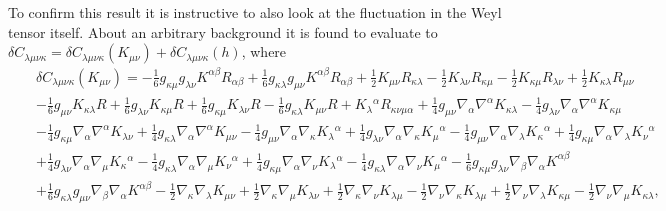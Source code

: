 \documentclass[aps]{revtex4}
\begin{document}
To confirm this result it is instructive to also look at the fluctuation in the Weyl tensor itself. About an arbitrary background it is found to evaluate to $\delta C_{\lambda\mu\nu\kappa}=\delta C_{\lambda\mu\nu\kappa}(K_{\mu\nu})+\delta C_{\lambda\mu\nu\kappa}(h)$, where
%
\begin{eqnarray}
&&\delta C_{\lambda\mu\nu\kappa}(K_{\mu\nu})=- \tfrac{1}{6} g_{\kappa \mu} g_{\lambda \nu} K^{\alpha \beta} R_{\alpha \beta} + \tfrac{1}{6} g_{\kappa \lambda} g_{\mu \nu} K^{\alpha \beta} R_{\alpha \beta} + \tfrac{1}{2} K_{\mu \nu} R_{\kappa \lambda} -  \tfrac{1}{2} K_{\lambda \nu} R_{\kappa \mu} -  \tfrac{1}{2} K_{\kappa \mu} R_{\lambda \nu} 
+ \tfrac{1}{2} K_{\kappa \lambda} R_{\mu \nu} 
\nonumber\\
&&-  \tfrac{1}{6} g_{\mu \nu} K_{\kappa \lambda} R 
+ \tfrac{1}{6} g_{\lambda \nu} K_{\kappa \mu} R + \tfrac{1}{6} g_{\kappa \mu} K_{\lambda \nu} R -  \tfrac{1}{6} g_{\kappa \lambda} K_{\mu \nu} R + K_{\lambda}{}^{\alpha} R_{\kappa \nu \mu \alpha} + \tfrac{1}{4} g_{\mu \nu} \nabla_{\alpha}\nabla^{\alpha}K_{\kappa \lambda} -  \tfrac{1}{4} g_{\lambda \nu} \nabla_{\alpha}\nabla^{\alpha}K_{\kappa \mu} 
\nonumber\\
&&-  \tfrac{1}{4} g_{\kappa \mu} \nabla_{\alpha}\nabla^{\alpha}K_{\lambda \nu} 
+ \tfrac{1}{4} g_{\kappa \lambda} \nabla_{\alpha}\nabla^{\alpha}K_{\mu \nu} -  \tfrac{1}{4} g_{\mu \nu} \nabla_{\alpha}\nabla_{\kappa}K_{\lambda}{}^{\alpha} + \tfrac{1}{4} g_{\lambda \nu} \nabla_{\alpha}\nabla_{\kappa}K_{\mu}{}^{\alpha} -  \tfrac{1}{4} g_{\mu \nu} \nabla_{\alpha}\nabla_{\lambda}K_{\kappa}{}^{\alpha} + \tfrac{1}{4} g_{\kappa \mu} \nabla_{\alpha}\nabla_{\lambda}K_{\nu}{}^{\alpha} 
\nonumber\\
&&+ \tfrac{1}{4} g_{\lambda \nu} \nabla_{\alpha}\nabla_{\mu}K_{\kappa}{}^{\alpha} -  \tfrac{1}{4} g_{\kappa \lambda} \nabla_{\alpha}\nabla_{\mu}K_{\nu}{}^{\alpha} + \tfrac{1}{4} g_{\kappa \mu} \nabla_{\alpha}\nabla_{\nu}K_{\lambda}{}^{\alpha} -  \tfrac{1}{4} g_{\kappa \lambda} \nabla_{\alpha}\nabla_{\nu}K_{\mu}{}^{\alpha} 
-  \tfrac{1}{6} g_{\kappa \mu} g_{\lambda \nu} \nabla_{\beta}\nabla_{\alpha}K^{\alpha \beta} 
\nonumber\\
&&+ \tfrac{1}{6} g_{\kappa \lambda} g_{\mu \nu} \nabla_{\beta}\nabla_{\alpha}K^{\alpha \beta} 
-  \tfrac{1}{2} \nabla_{\kappa}\nabla_{\lambda}K_{\mu \nu} + \tfrac{1}{2} \nabla_{\kappa}\nabla_{\mu}K_{\lambda \nu} 
+ \tfrac{1}{2} \nabla_{\kappa}\nabla_{\nu}K_{\lambda \mu} - \tfrac{1}{2} \nabla_{\nu}\nabla_{\kappa}K_{\lambda \mu} + \tfrac{1}{2} \nabla_{\nu}\nabla_{\lambda}K_{\kappa \mu} 
-  \tfrac{1}{2} \nabla_{\nu}\nabla_{\mu}K_{\kappa \lambda},
\nonumber\\
\label{AP51}
\end{eqnarray}
\end{document}
